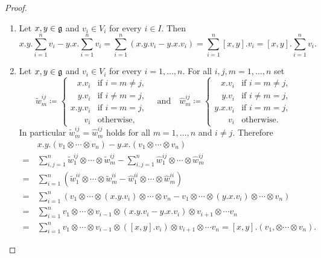 \begin{proof}
 \begin{enumerate}[leftmargin=*]
  \item
   Let $x,y \in \mathfrak{g}$ and $v_i \in V_i$ for every $i \in I$. Then
   \[
    x.y.\sum_{i=1}^n v_i - y.x.\sum_{i=1}^n v_i
    = \sum_{i=1}^n (x.y.v_i - y.x.v_i)
    = \sum_{i=1}^n [x,y].v_i
    = [x,y].\sum_{i=1}^n v_i.
   \]
   
  \item
   Let $x,y \in \mathfrak{g}$ and $v_i \in V_i$ for every $i = 1, \dotsc, n$. For all $i,j,m = 1, \dotsc, n$ set
   \[
    \tilde{w}^{ij}_m \coloneqq
    \begin{cases}
     \phantom{y.}x.v_i & \text{if $i = m \neq j$}, \\
     \phantom{x.}y.v_i & \text{if $i \neq m = j$}, \\
               x.y.v_i & \text{if $i = m= j$}, \\
     \phantom{x.y.}v_i & \text{otherwise},
    \end{cases}
    \quad\text{and}\quad
    \hat{w}^{ij}_m \coloneqq
    \begin{cases}
     \phantom{y.}x.v_i & \text{if $i = m \neq j$}, \\
     \phantom{x.}y.v_i & \text{if $i \neq m = j$}, \\
               y.x.v_i & \text{if $i = m = j$}, \\
     \phantom{y.x.}v_i & \text{otherwise}.
    \end{cases}
   \]
   In particular $\tilde{w}^{ij}_m = \hat{w}^{ij}_m$ holds for all $m = 1, \dotsc, n$ and $i \neq j$. Therefore
   \begin{align*}
     &\, x.y.(v_1 \otimes \dotsb \otimes v_n) - y.x.(v_1 \otimes \dotsb \otimes v_n) \\
    =&\, \sum_{i,j=1}^n \tilde{w}^{ij}_1 \otimes \dotsb \otimes \tilde{w}^{ij}_m
         - \sum_{i,j=1}^n \hat{w}^{ij}_1 \otimes \dotsb \otimes \hat{w}^{ij}_m \\
    =&\, \sum_{i=1}^n ( \tilde{w}^{ii}_1 \otimes \dotsb \otimes \tilde{w}^{ii}_m
                       -\hat{w}^{ii}_1 \otimes \dotsb \otimes \hat{w}^{ii}_m ) \\
    =&\, \sum_{i=1}^n \left( v_1 \otimes \dotsb \otimes (x.y.v_i) \otimes \dotsb \otimes v_n
                            -v_1 \otimes \dotsb \otimes (y.x.v_i) \otimes \dotsb \otimes v_n \right) \\
    =&\, \sum_{i=1}^n v_1 \otimes \dotsb \otimes v_{i-1} \otimes (x.y.v_i - y.x.v_i)
                          \otimes v_{i+1} \otimes \dotsb v_n \\
    =&\, \sum_{i=1}^n v_1 \otimes \dotsb \otimes v_{i-1} \otimes ([x,y].v_i) \otimes v_{i+1} \otimes \dotsb v_n
    = [x,y].(v_1, \otimes \dotsb \otimes v_n).
   \end{align*}
   

\end{enumerate}
\end{proof}
